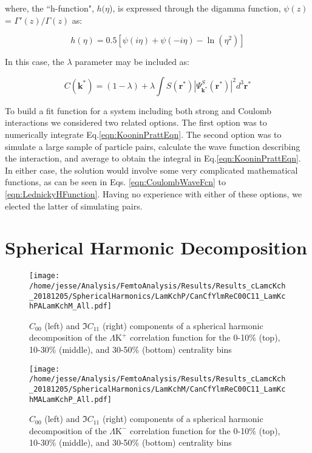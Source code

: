 \documentclass[ALICE,manyauthors]{cernphprep}
\newcommand{\LamKchP}{$\Lambda\mathrm{K^{+}}$\xspace}
\newcommand{\LamKchM}{$\Lambda\mathrm{K^{-}}$\xspace}
\begin{document}
where, the ``h-function", $h(\eta$), is expressed through the digamma function, $\psi(z)$ = $\Gamma'(z)/\Gamma(z)$ as:

\begin{equation}
 h(\eta) = 0.5[\psi(i\eta) + \psi(-i\eta) - \ln(\eta^{2})]
\label{eqn:LednickyHFunction}
\end{equation} 

In this case, the $\lambda$ parameter may be included as: 

\begin{equation}
 C(\mathbf{k^{*}}) = (1 - \lambda) + \lambda\int S(\mathbf{r^{*}})|\Psi^{S}_{\mathbf{k^{*}}}(\mathbf{r^{*}})|^{2}d^{3}\mathbf{r^{*}}
\label{eqn:GenCfEqnwLambda}
\end{equation}

To build a fit function for a system including both strong and Coulomb interactions we considered two related options. 
The first option was to numerically integrate Eq.\ref{eqn:KooninPrattEqn}.  
The second option was to simulate a large sample of particle pairs, calculate the wave function describing the interaction, and average to obtain the integral in Eq.\ref{eqn:KooninPrattEqn}. 
In either case, the solution would involve some very complicated mathematical functions, as can be seen in Eqs. \ref{eqn:CoulombWaveFcn} to \ref{eqn:LednickyHFunction}.
Having no experience with either of these options, we elected the latter of simulating pairs.


\section{Spherical Harmonic Decomposition}
\label{app:SphericalHarmonics}

\begin{figure}[h]
  \centering
  \texttt{[image: /home/jesse/Analysis/FemtoAnalysis/Results/Results\_cLamcKch\_20181205/SphericalHarmonics/LamKchP/CanCfYlmReC00C11\_LamKchPALamKchM\_All.pdf]}
  \caption[\LamKchP $C_{00}$ and $\Im C_{11}$ Spherical Harmonic Components]{$C_{00}$ (left) and $\Im C_{11}$ (right) components of a spherical harmonic decomposition of the \LamKchP correlation function for the 0-10\% (top), 10-30\% (middle), and 30-50\% (bottom) centrality bins}
  \label{fig:LamKchP_ReC00C11_All}
\end{figure}




\begin{figure}[h]
  \centering
  \texttt{[image: /home/jesse/Analysis/FemtoAnalysis/Results/Results\_cLamcKch\_20181205/SphericalHarmonics/LamKchM/CanCfYlmReC00C11\_LamKchMALamKchP\_All.pdf]}
  \caption[\LamKchM $C_{00}$ and $\Im C_{11}$ Spherical Harmonic Components]{$C_{00}$ (left) and $\Im C_{11}$ (right) components of a spherical harmonic decomposition of the \LamKchM correlation function for the 0-10\% (top), 10-30\% (middle), and 30-50\% (bottom) centrality bins}
  \label{fig:LamKchM_ReC00C11_All}
\end{figure}
\end{document}
